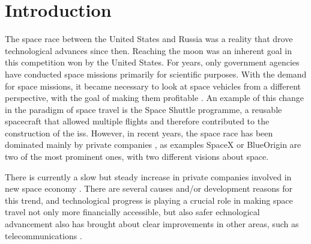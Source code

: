 
\chapter{Introduction}
\label{chapter:introduction}

The space race between the United States and Russia was a reality that drove technological advances since then. Reaching the moon was an inherent goal in this competition won by the United States. For years, only government agencies have conducted space missions primarily for scientific purposes. With the demand for space missions, it became necessary to look at space vehicles from a different perspective, with the goal of making them profitable \cite{gomes_road_2013}. An example of this change in the paradigm of space travel is the Space Shuttle programme, a reusable spacecraft that allowed multiple flights and therefore contributed to the construction of the \gls{iss}. However, in recent years, the space race has been dominated mainly by private companies \cite{gomes_road_2013}, as examples SpaceX \cite{noauthor_spacex_nodate}  or BlueOrigin \cite{noauthor_blueorigin_nodate} are two of the most prominent ones, with two different visions about space.

There is currently a slow but steady increase in private companies involved in new space economy \cite{quinn_acceptable_nodate}. There are several causes and/or development reasons for this trend, and technological progress is playing a crucial role in making space travel not only more financially accessible, but also safer \cite{blue_l_2017} echnological advancement also has brought about clear improvements in other areas, such as telecommunications \cite{garzaniti_review_2021}.

